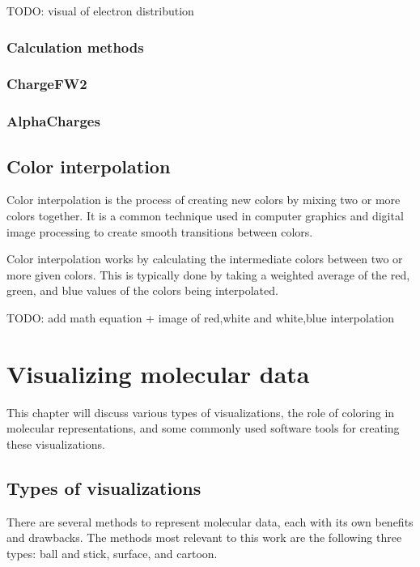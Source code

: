 \documentclass[
  digital,     %
  oneside,     %
  nosansbold,  %
  nocolorbold, %
  lof,         %
  lot,         %
]{fithesis4}
\begin{document}
TODO: visual of electron distribution

\subsection{Calculation methods}
\label{subsection:calculation_methods}

\subsection{ChargeFW2}
\label{subsection:chargfw2}

\subsection{AlphaCharges}
\label{subsection:alphacharges}

\section{Color interpolation}
\label{section:color_interpolation}

Color interpolation is the process of creating new colors by mixing two or more colors together. It is a common technique used in computer graphics and digital image processing to create smooth transitions between colors.

Color interpolation works by calculating the intermediate colors between two or more given colors. This is typically done by taking a weighted average of the red, green, and blue values of the colors being interpolated.

TODO: add math equation + image of red,white and white,blue interpolation

\chapter{Visualizing molecular data}
\label{chapter:visualizing_molecular_data}

This chapter will discuss various types of visualizations, the role of coloring in molecular representations, and some commonly used software tools for creating these visualizations.

\section{Types of visualizations}
\label{section:types_of_visualizations}

There are several methods to represent molecular data, each with its own benefits and drawbacks. The methods most relevant to this work are the following three types: ball and stick, surface, and cartoon.
\end{document}
